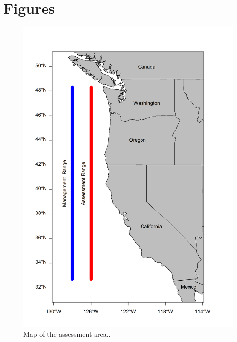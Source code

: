 \documentclass[11pt,
  english,
  a4paper,
]{article}
\begin{document}
\endgroup{}

\clearpage


\hypertarget{figures}{%
\section{Figures}\label{figures}}

\leavevmode\tagmcend\tagstructend


\begin{figure}
\centering
\includegraphics[width=1\textwidth,height=1\textheight]{figs/map.png}
\caption{Map of the assessment area..\label{fig:map}}
\end{figure}
\end{document}
